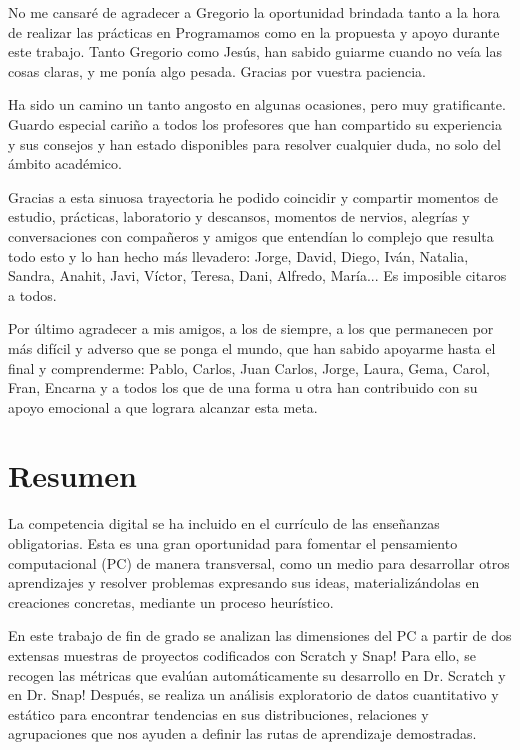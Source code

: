 \documentclass[a4paper, 12pt]{book}
\begin{document}
No me cansaré de agradecer a Gregorio la oportunidad brindada tanto a la hora de realizar las prácticas en Programamos como en la propuesta y apoyo durante este trabajo. Tanto Gregorio como Jesús, han sabido guiarme cuando no veía las cosas claras, y me ponía algo pesada. Gracias por vuestra paciencia. 

Ha sido un camino un tanto angosto en algunas ocasiones, pero muy gratificante. Guardo especial cariño a todos los profesores que han compartido su experiencia y sus consejos y han estado disponibles para resolver cualquier duda, no solo del ámbito académico. 

Gracias a esta sinuosa trayectoria he podido coincidir y compartir momentos de estudio, prácticas, laboratorio y descansos, momentos de nervios, alegrías y conversaciones con compañeros y amigos que entendían lo complejo que resulta todo esto y lo han hecho más llevadero: Jorge, David, Diego, Iván, Natalia, Sandra, Anahit, Javi, Víctor, Teresa, Dani, Alfredo, María... Es imposible citaros a todos.

Por último agradecer a mis amigos, a los de siempre, a los que permanecen por más difícil y adverso que se ponga el mundo, que han sabido apoyarme hasta el final y comprenderme: Pablo, Carlos, Juan Carlos, Jorge, Laura, Gema, Carol, Fran, Encarna y a todos los que de una forma u otra han contribuido con su apoyo emocional a que lograra alcanzar esta meta. 



\chapter*{Resumen}

La competencia digital se ha incluido en el currículo de las enseñanzas obligatorias. Esta es una gran oportunidad para fomentar el pensamiento computacional (PC) de manera transversal, como un medio para desarrollar otros aprendizajes y resolver problemas expresando sus ideas, materializándolas en creaciones concretas, mediante un proceso heurístico.

En este trabajo de fin de grado se analizan las dimensiones del PC a partir de dos extensas muestras de proyectos codificados con Scratch y Snap! Para ello, se recogen las métricas que evalúan automáticamente su desarrollo en Dr. Scratch y en Dr. Snap! Después, se realiza un análisis exploratorio de datos cuantitativo y estático para encontrar tendencias en sus distribuciones, relaciones y agrupaciones que nos ayuden a definir las rutas de aprendizaje demostradas. 
\end{document}
